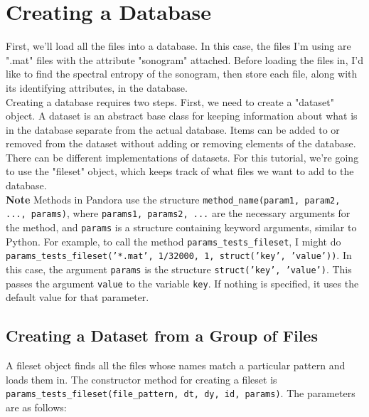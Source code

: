 \documentclass{article}
\begin{document}
\section{Creating a Database}

First, we'll load all the files into a database. In this case, the files I'm using are ".mat" files with the attribute "sonogram" attached. Before loading the files in, I'd like to find the spectral entropy of the sonogram, then store each file, along with its identifying attributes, in the database.\\

Creating a database requires two steps. First, we need to create a "dataset" object. A dataset is an abstract base class for keeping information about what is in the database separate from the actual database. Items can be added to or removed from the dataset without adding or removing elements of the database.\\

There can be different implementations of datasets. For this tutorial, we're going to use the "fileset" object, which keeps track of what files we want to add to the database.\\

\textbf{Note} Methods in Pandora use the structure \texttt{method\_name(param1, param2, ..., params)}, where \texttt{params1, params2, ...} are the necessary arguments for the method, and \texttt{params} is a structure containing keyword arguments, similar to Python. For example, to call the method \texttt{params\_tests\_fileset}, I might do \texttt{params\_tests\_fileset('*.mat', 1/32000, 1, struct('key', 'value'))}. In this case, the argument \texttt{params} is the structure \texttt{struct('key', 'value')}. This passes the argument \texttt{value} to the variable \texttt{key}. If nothing is specified, it uses the default value for that parameter.

\subsection{Creating a Dataset from a Group of Files}

A fileset object finds all the files whose names match a particular pattern and loads them in. The constructor method for creating a fileset is \texttt{params\_tests\_fileset(file\_pattern, dt, dy, id, params)}. The parameters are as follows:\\
\end{document}
